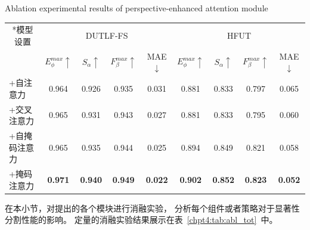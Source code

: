 \begin{table}[!ht]
	{Ablation experimental results of perspective-enhanced attention module}
	\centering
	\label{chpt4:tab:abl_attn}
		\begin{tabular}{lcccccccc}
			\toprule[2pt]  %
			
			\multicolumn{1}{c}{ \multirow{2}*{模型设置}}	& \multicolumn{4}{c}{DUTLF-FS} & \multicolumn{4}{c}{HFUT} \\ 
			
			
			\cmidrule(r){2-5} \cmidrule(r){6-9} 
			
			& $E_{\phi}^{max}\uparrow$ & $S_{\alpha }\uparrow $ & $F_{\beta}^{max}\uparrow$ & MAE$\downarrow$ 
			& $E_{\phi}^{max}\uparrow$ & $S_{\alpha }\uparrow $ & $F_{\beta}^{max}\uparrow$ & MAE$\downarrow$
			\\
			
			\midrule
			
			
			
			+自注意力 
			& 0.964 & 0.926 & 0.935 & 0.031 
			& 0.881 & 0.833 & 0.797 & 0.065   \\
			
			+交叉注意力
			& 0.965 & 0.931 & 0.943 & 0.027 
			& 0.881 & 0.833 & 0.795 & 0.060   \\
			
			+自掩码注意力  
			& 0.965 & 0.935 & 0.944 & 0.025 
			& 0.894 & 0.849 & 0.821 & 0.058   \\
			
			+掩码注意力   
			& \textbf{0.971} & \textbf{0.940} & \textbf{0.949} & \textbf{0.022} 
			& \textbf{0.902} & \textbf{0.852} & \textbf{0.823} & \textbf{0.052}  \\
			
			\bottomrule[2pt]
		\end{tabular}
\end{table}




在本小节，对提出的各个模块进行消融实验，
分析每个组件或者策略对于显著性分割性能的影响。
定量的消融实验结果展示在表~\ref{chpt4:tab:abl_tot}~中。




